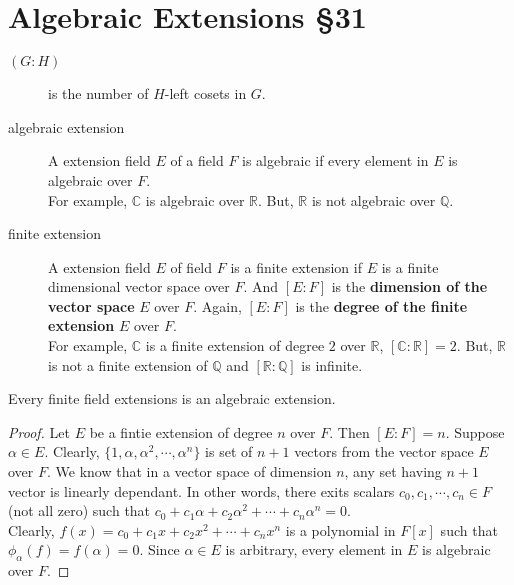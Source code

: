 \section{Algebraic Extensions \S31}
\begin{description}
	\item[$(G : H)$] is the number of $H$-left cosets in $G$.
	\item[algebraic extension] A extension field $E$ of a field $F$ is algebraic if every element in $E$ is algebraic over $F$.\\
		For example, $\mathbb{C}$ is algebraic over $\mathbb{R}$.
		But, $\mathbb{R}$ is not algebraic over $\mathbb{Q}$.
	\item[finite extension] A extension field $E$ of field $F$ is a finite extension if $E$ is a finite dimensional vector space over $F$.
		And $[E:F]$ is the \textbf{dimension of the vector space} $E$ over $F$.
		Again, $[E:F]$ is the \textbf{degree of the finite extension} $E$ over $F$.\\
		For example, $\mathbb{C}$ is a finite extension of degree $2$ over $\mathbb{R}$, $[\mathbb{C} : \mathbb{R}] = 2$. But, $\mathbb{R}$ is not a finite extension of $\mathbb{Q}$ and $[\mathbb{R} : \mathbb{Q}]$ is infinite.
\end{description}

\begin{theorem}
	Every finite field extensions is an algebraic extension.
\end{theorem}
\begin{proof}
	Let $E$ be a fintie extension of degree $n$ over $F$.
	Then $[E:F] = n$.
	Suppose $\alpha \in E$.
	Clearly, $\{1,\alpha,\alpha^2,\cdots,\alpha^n \}$ is set of $n+1$ vectors from the vector space $E$ over $F$.
	We know that in a vector space of dimension $n$, any set having $n+1$ vector is linearly dependant.
	In other words, there exits scalars $c_0,c_1,\cdots,c_n \in F$ (not all zero) such that $c_0+c_1\alpha+c_2\alpha^2+\cdots+c_n\alpha^n = 0$.\\

	Clearly, $f(x) = c_0 + c_1x + c_2x^2 + \cdots +c_nx^n$ is a polynomial in $F[x]$ such that $\phi_\alpha(f) = f(\alpha) = 0$.
	Since $\alpha \in E$ is arbitrary, every element in $E$ is algebraic over $F$.
\end{proof}


